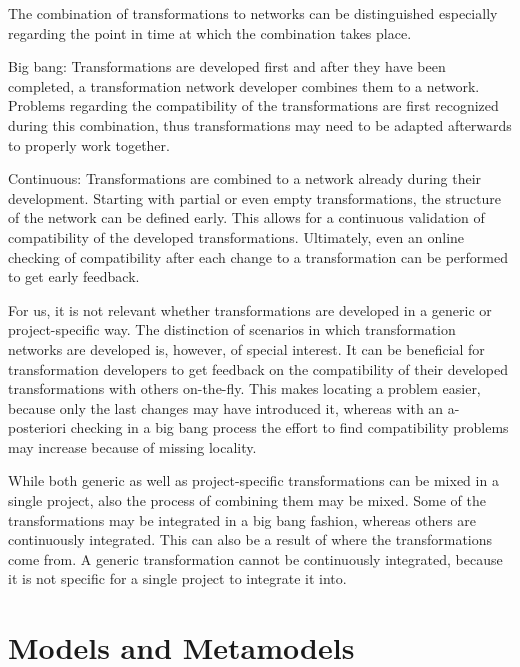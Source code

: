 The combination of transformations to networks can be distinguished especially regarding the point in time at which the combination takes place.
\begin{properdescription}
    \item[Big bang:] Transformations are developed first and after they have been completed, a transformation network developer combines them to a network. Problems regarding the compatibility of the transformations are first recognized during this combination, thus transformations may need to be adapted afterwards to properly work together.
    \item[Continuous:] Transformations are combined to a network already during their development. Starting with partial or even empty transformations, the structure of the network can be defined early. This allows for a continuous validation of compatibility of the developed transformations. Ultimately, even an online checking of compatibility after each change to a transformation can be performed to get early feedback.
\end{properdescription}

For us, it is not relevant whether transformations are developed in a generic or project-specific way.
The distinction of scenarios in which transformation networks are developed is, however, of special interest.
It can be beneficial for transformation developers to get feedback on the compatibility of their developed transformations with others on-the-fly.
This makes locating a problem easier, because only the last changes may have introduced it, whereas with an a-posteriori checking in a big bang process the effort to find compatibility problems may increase because of missing locality.

While both generic as well as project-specific transformations can be mixed in a single project, also the process of combining them may be mixed.
Some of the transformations may be integrated in a big bang fashion, whereas others are continuously integrated.
This can also be a result of where the transformations come from.
A generic transformation cannot be continuously integrated, because it is not specific for a single project to integrate it into.


\section{Models and Metamodels}

